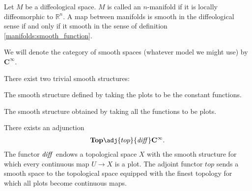 
    \begin{adefinition}[Manifold]
        Let $M$ be a diffeological space. $M$ is called an $n$-manifold if it is locally diffeomorphic to $\mathbb{R}^n$. A map between manifolds is smooth in the diffeological sense if and only if it smooth in the sense of definition \ref{manifolds:smooth_function}.
    \end{adefinition}

    \begin{notation}
        We will denote the category of smooth spaces (whatever model we might use) by $\mathbf{C^\infty}$.
    \end{notation}

    There exist two trivial smooth structures:
    \begin{example}
        The smooth structure defined by taking the plots to be the constant functions.
    \end{example}
    \begin{example}
        The smooth structure obtained by taking all the functions to be plots.
    \end{example}

    \begin{property}
        There exists an adjunction
        \begin{gather}
            \mathbf{Top}\adj{top}{\text{\textit{diff}}}\mathbf{C^\infty}.
        \end{gather}
        The functor $\text{\textit{diff}}$ endows a topological space $X$ with the smooth structure for which every continuous map $U\rightarrow X$ is a plot. The adjoint functor $top$ sends a smooth space to the topological space equipped with the finest topology for which all plots become continuous maps.
    \end{property}


